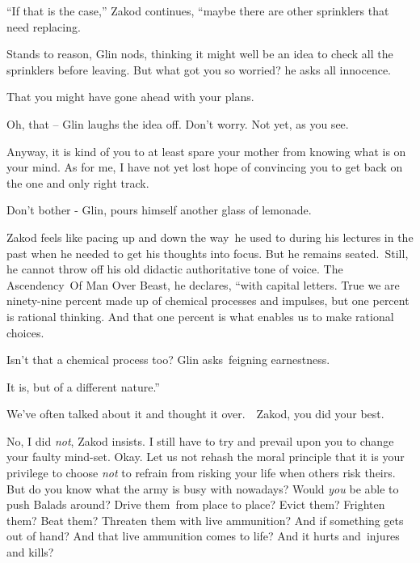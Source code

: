 \documentclass[letterpaper]{article}
\begin{document}
{}``If that is the case,'' Zakod continues, ``maybe there are other sprinklers that need replacing.{\textquotedbl} 

{\textquotedbl}Stands to reason,{\textquotedbl} Glin nods, thinking it might well be an idea to check all the sprinklers
before leaving. {\textquotedbl}But what got you so worried?{\textquotedbl} he asks all innocence. 

{\textquotedbl}That you might have gone ahead with your plans.{\textquotedbl} 

{\textquotedbl}Oh, that -- {\textquotedbl} Glin laughs the idea off. {\textquotedbl}Don't worry. Not yet, as you
see.{\textquotedbl} 

{\textquotedbl}Anyway, it is kind of you to at least spare your mother from knowing what is on your mind. As for me, I
have not yet lost hope of convincing you to get back on the one and only right track.{\textquotedbl} 

{\textquotedbl}Don't bother -{\textquotedbl} Glin, pours himself another glass of lemonade. 

Zakod feels like pacing up and down the way~he used to during his lectures in the past when he needed to get his
thoughts into focus. But he remains seated.\ Still, he cannot throw off his old didactic authoritative tone of voice.
{\textquotedbl}The Ascendency\ Of Man Over Beast,{\textquotedbl} he declares, ``with capital letters. True we are
ninety-nine percent made up of chemical processes and impulses, but one percent is rational thinking. And that one
percent is what enables us to make rational choices.{\textquotedbl} 

{\textquotedbl}Isn't that a chemical process too?{\textquotedbl} Glin
asks\textcolor[rgb]{0.0,0.4392157,0.7529412}{\ }feigning earnestness. 

{\textquotedbl}It is, but of a different nature.'' 

{\textquotedbl}We've often talked about it and thought it over.\ \ Zakod, you did your best.{\textquotedbl} 

{\textquotedbl}No, I did \textit{not},{\textquotedbl} Zakod insists. {\textquotedbl}I still have to try and prevail upon
you to change your faulty mind-set. Okay. Let us not rehash the moral principle that it is your privilege to choose
\textit{not} to refrain from risking your life when others risk theirs. But do you know what the army is busy with
nowadays? Would \textit{you} be able to push Balads around? Drive them~from place to place? Evict them? Frighten them?
Beat them? Threaten them with live ammunition? And if something gets out of hand? And that live ammunition comes to
life? And it hurts and~injures and kills?{\textquotedbl} 
\end{document}
